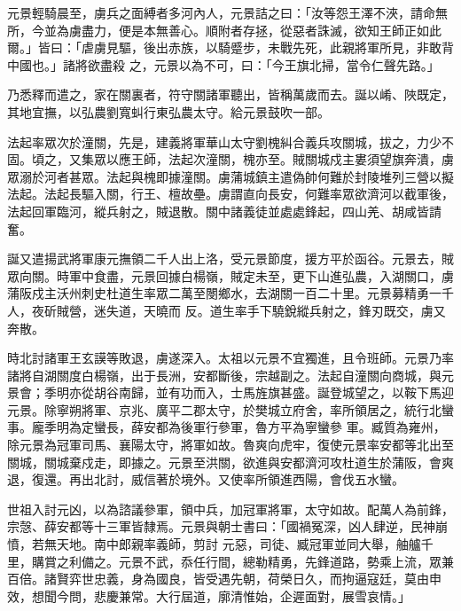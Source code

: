 \begin{pinyinscope}
 元景輕騎晨至，虜兵之面縛者多河內人，元景詰之曰：「汝等怨王澤不浹，請命無所，今並為虜盡力，便是本無善心。順附者存拯，從惡者誅滅，欲知王師正如此爾。」皆曰：「虐虜見驅，後出赤族，以騎蹙步，未戰先死，此親將軍所見，非敢背中國也。」諸將欲盡殺
 之，元景以為不可，曰：「今王旗北掃，當令仁聲先路。」



 乃悉釋而遣之，家在關裏者，符守關諸軍聽出，皆稱萬歲而去。誕以崤、陜既定，其地宜撫，以弘農劉寬虯行東弘農太守。給元景鼓吹一部。



 法起率眾次於潼關，先是，建義將軍華山太守劉槐糾合義兵攻關城，拔之，力少不固。頃之，又集眾以應王師，法起次潼關，槐亦至。賊關城戍主婁須望旗奔潰，虜眾溺於河者甚眾。法起與槐即據潼關。虜蒲城鎮主遣偽帥何難於封陵堆列三營以擬
 法起。法起長驅入關，行王、檀故壘。虜謂直向長安，何難率眾欲濟河以截軍後，法起回軍臨河，縱兵射之，賊退散。關中諸義徒並處處鋒起，四山羌、胡咸皆請奮。



 誕又遣揚武將軍康元撫領二千人出上洛，受元景節度，援方平於函谷。元景去，賊眾向關。時軍中食盡，元景回據白楊嶺，賊定未至，更下山進弘農，入湖關口，虜蒲阪戍主沃州刺史杜道生率眾二萬至閿鄉水，去湖關一百二十里。元景募精勇一千人，夜斫賊營，迷失道，天曉而
 反。道生率手下驍銳縱兵射之，鋒刃既交，虜又奔散。



 時北討諸軍王玄謨等敗退，虜遂深入。太祖以元景不宜獨進，且令班師。元景乃率諸將自湖關度白楊嶺，出于長洲，安都斷後，宗越副之。法起自潼關向商城，與元景會；季明亦從胡谷南歸，並有功而入，士馬旌旗甚盛。誕登城望之，以鞍下馬迎元景。除寧朔將軍、京兆、廣平二郡太守，於樊城立府舍，率所領居之，統行北蠻事。龐季明為定蠻長，薛安都為後軍行參軍，魯方平為寧蠻參
 軍。臧質為雍州，除元景為冠軍司馬、襄陽太守，將軍如故。魯爽向虎牢，復使元景率安都等北出至關城，關城棄戍走，即據之。元景至洪關，欲進與安都濟河攻杜道生於蒲阪，會爽退，復還。再出北討，威信著於境外。又使率所領進西陽，會伐五水蠻。



 世祖入討元凶，以為諮議參軍，領中兵，加冠軍將軍，太守如故。配萬人為前鋒，宗愨、薛安都等十三軍皆隸焉。元景與朝士書曰：「國禍冤深，凶人肆逆，民神崩憤，若無天地。南中郎親率義師，剪討
 元惡，司徒、臧冠軍並同大舉，舳艫千里，購賞之利備之。元景不武，忝任行間，總勒精勇，先鋒道路，勢乘上流，眾兼百倍。諸賢弈世忠義，身為國良，皆受遇先朝，荷榮日久，而拘逼寇廷，莫由申效，想聞今問，悲慶兼常。大行屆道，廓清惟始，企遲面對，展雪哀情。」




\end{pinyinscope}
